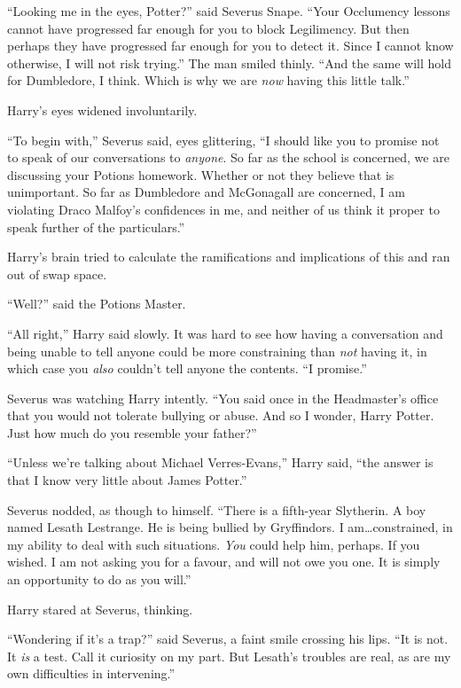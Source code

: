 “Looking me in the eyes, Potter?” said Severus Snape. “Your Occlumency lessons
cannot have progressed far enough for you to block Legilimency. But then
perhaps they have progressed far enough for you to detect it. Since I cannot
know otherwise, I will not risk trying.” The man smiled thinly. “And the same
will hold for Dumbledore, I think. Which is why we are \emph{now} having this
little talk.”

Harry’s eyes widened involuntarily.

“To begin with,” Severus said, eyes glittering, “I should like you to promise
not to speak of our conversations to \emph{anyone}. So far as the school is
concerned, we are discussing your Potions homework. Whether or not they believe
that is unimportant. So far as Dumbledore and McGonagall are concerned, I am
violating Draco Malfoy’s confidences in me, and neither of us think it proper
to speak further of the particulars.”

Harry’s brain tried to calculate the ramifications and implications of this and
ran out of swap space.

“Well?” said the Potions Master.

“All right,” Harry said slowly. It was hard to see how having a conversation
and being unable to tell anyone could be more constraining than \emph{not}
having it, in which case you \emph{also} couldn’t tell anyone the contents. “I
promise.”

Severus was watching Harry intently. “You said once in the Headmaster’s office
that you would not tolerate bullying or abuse. And so I wonder, Harry Potter.
Just how much do you resemble your father?”

“Unless we’re talking about Michael Verres-Evans,” Harry said, “the answer is
that I know very little about James Potter.”

Severus nodded, as though to himself. “There is a fifth-year Slytherin. A boy
named Lesath Lestrange. He is being bullied by Gryffindors. I am…constrained,
in my ability to deal with such situations. \emph{You} could help
him, perhaps. If you wished. I am not asking you for a favour, and will not owe
you one. It is simply an opportunity to do as you will.”

Harry stared at Severus, thinking.

“Wondering if it’s a trap?” said Severus, a faint smile crossing his lips. “It
is not. It \emph{is} a test. Call it curiosity on my part. But Lesath’s
troubles are real, as are my own difficulties in intervening.”

